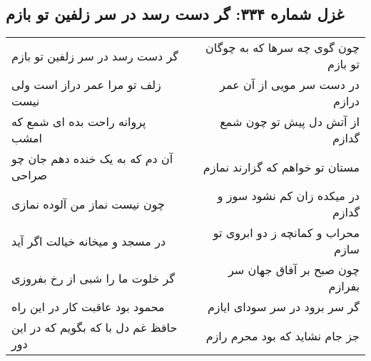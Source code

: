 \begin{center}
\section*{غزل شماره ۳۳۴: گر دست رسد در سر زلفین تو بازم}
\label{sec:sh334}
\begin{longtable}{l p{0.5cm} r}
گر دست رسد در سر زلفین تو بازم
&&
چون گوی چه سرها که به چوگان تو بازم
\\
زلف تو مرا عمر دراز است ولی نیست
&&
در دست سر مویی از آن عمر درازم
\\
پروانه راحت بده ای شمع که امشب
&&
از آتش دل پیش تو چون شمع گدازم
\\
آن دم که به یک خنده دهم جان چو صراحی
&&
مستان تو خواهم که گزارند نمازم
\\
چون نیست نماز من آلوده نمازی
&&
در میکده زان کم نشود سوز و گدازم
\\
در مسجد و میخانه خیالت اگر آید
&&
محراب و کمانچه ز دو ابروی تو سازم
\\
گر خلوت ما را شبی از رخ بفروزی
&&
چون صبح بر آفاق جهان سر بفرازم
\\
محمود بود عاقبت کار در این راه
&&
گر سر برود در سر سودای ایازم
\\
حافظ غم دل با که بگویم که در این دور
&&
جز جام نشاید که بود محرم رازم
\\
\end{longtable}
\end{center}
